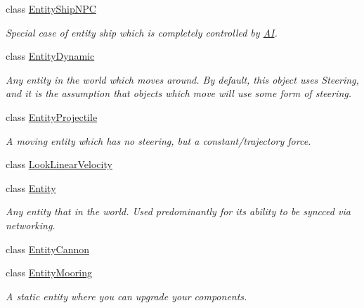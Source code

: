 \begin{DoxyCompactItemize}
class \hyperlink{class_skyrates_1_1_entity_1_1_entity_ship_n_p_c}{Entity\-Ship\-N\-P\-C}
\begin{DoxyCompactList}\small\item\em Special case of entity ship which is completely controlled by \hyperlink{namespace_skyrates_1_1_a_i}{A\-I}. \end{DoxyCompactList}\item 
class \hyperlink{class_skyrates_1_1_entity_1_1_entity_dynamic}{Entity\-Dynamic}
\begin{DoxyCompactList}\small\item\em Any entity in the world which moves around. By default, this object uses Steering, and it is the assumption that objects which move will use some form of steering. \end{DoxyCompactList}\item 
class \hyperlink{class_skyrates_1_1_entity_1_1_entity_projectile}{Entity\-Projectile}
\begin{DoxyCompactList}\small\item\em A moving entity which has no steering, but a constant/trajectory force. \end{DoxyCompactList}\item 
class \hyperlink{class_skyrates_1_1_entity_1_1_look_linear_velocity}{Look\-Linear\-Velocity}
\item 
class \hyperlink{class_skyrates_1_1_entity_1_1_entity}{Entity}
\begin{DoxyCompactList}\small\item\em Any entity that in the world. Used predominantly for its ability to be syncced via networking. \end{DoxyCompactList}\item 
class \hyperlink{class_skyrates_1_1_entity_1_1_entity_cannon}{Entity\-Cannon}
\item 
class \hyperlink{class_skyrates_1_1_entity_1_1_entity_mooring}{Entity\-Mooring}
\begin{DoxyCompactList}\small\item\em A static entity where you can upgrade your components. \end{DoxyCompactList}\end{DoxyCompactItemize}

